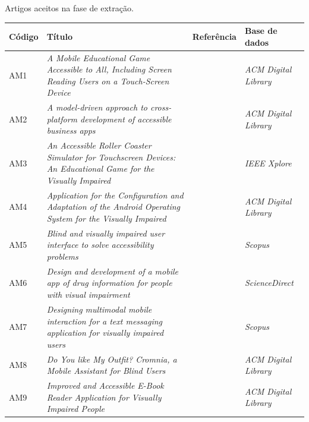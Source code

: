 \begin{quadro}[htb!]
  \caption{\label{qua-art-ext}Artigos aceitos na fase de extração.}
  \begin{tabular}{|m{1.2cm} | m{8.0cm} | m{2.6cm} | m{2.5cm}|}
    \hline
    \textbf{Código} & \textbf{Título}                                                                                                                    & \textbf{Referência}     & \textbf{Base de dados}     \\ \hline
    AM1            & \emph{A Mobile Educational Game Accessible to All, Including Screen Reading Users on a Touch-Screen Device}                        & \cite{Leporini2017}     & \emph{ACM Digital Library} \\ \hline
    AM2            & \emph{A model-driven approach to cross-platform development of accessible business apps}                                           & \cite{Christoph2020}    & \emph{ACM Digital Library} \\ \hline
    AM3            & \emph{An Accessible Roller Coaster Simulator for Touchscreen Devices: An Educational Game for the Visually Impaired}               & \cite{Biase2018}        & \emph{IEEE Xplore}         \\ \hline
    AM4            & \emph{Application for the Configuration and Adaptation of the Android Operating System for the Visually Impaired}                  & \cite{Oliveira2018}     & \emph{ACM Digital Library} \\ \hline
    AM5            & \emph{Blind and visually impaired user interface to solve accessibility problems}                                                  & \cite{Shera2021285}     & \emph{Scopus}              \\ \hline
    AM6            & \emph{Design and development of a mobile app of drug information for people with visual impairment}                                & \cite{Amariles2020}     & \emph{ScienceDirect}       \\ \hline
    AM7            & \emph{Designing multimodal mobile interaction for a text messaging application for visually impaired users}                        & \cite{Duarte2017}       & \emph{Scopus}              \\ \hline
    AM8            & \emph{Do You like My Outfit? Cromnia, a Mobile Assistant for Blind Users}                                                          & \cite{Giuliana2018}     & \emph{ACM Digital Library} \\ \hline
    AM9            & \emph{Improved and Accessible E-Book Reader Application for Visually Impaired People}                                              & \cite{Heesook2017}      & \emph{ACM Digital Library} \\ \hline

\end{tabular}
\end{quadro}
